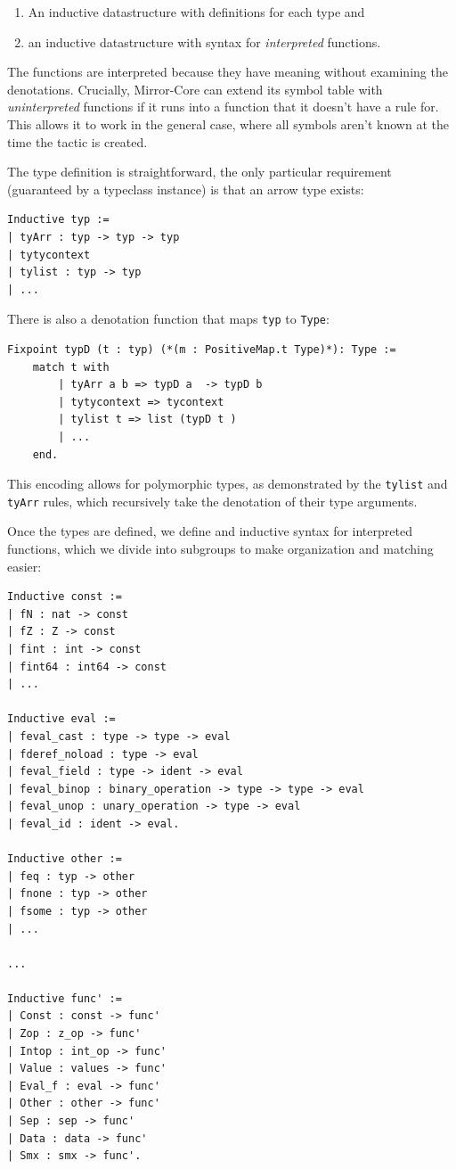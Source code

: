\documentclass{puthesis}
\begin{document}
\begin{enumerate}
\item An inductive datastructure with definitions for each type and
\item an inductive datastructure with syntax for \emph{interpreted}
  functions.
\end{enumerate}

The functions are interpreted because they have meaning without
examining the denotations. Crucially, Mirror-Core can extend its
symbol table with \emph{uninterpreted} functions if it runs into a
function that it doesn't have a rule for. This allows it to work in
the general case, where all symbols aren't known at the time the
tactic is created. 

The type definition is straightforward, the only particular
requirement (guaranteed by a typeclass instance) is that an arrow type
exists:

\begin{lstlisting}
Inductive typ :=
| tyArr : typ -> typ -> typ
| tytycontext
| tylist : typ -> typ
| ...
\end{lstlisting}

There is also a denotation function that maps \lstinline|typ| to
\lstinline|Type|:

\begin{lstlisting} 
Fixpoint typD (t : typ) (*(m : PositiveMap.t Type)*): Type :=
    match t with
        | tyArr a b => typD a  -> typD b
        | tytycontext => tycontext
        | tylist t => list (typD t )
        | ...
    end.
\end{lstlisting}

This encoding allows for polymorphic types, as demonstrated by the
\lstinline|tylist| and \lstinline|tyArr| rules, which recursively take
the denotation of their type arguments.

Once the types are defined, we define and inductive syntax for
interpreted functions, which we divide into subgroups to make
organization and matching easier:

\begin{lstlisting}
Inductive const :=
| fN : nat -> const
| fZ : Z -> const
| fint : int -> const
| fint64 : int64 -> const
| ...

Inductive eval :=
| feval_cast : type -> type -> eval
| fderef_noload : type -> eval
| feval_field : type -> ident -> eval
| feval_binop : binary_operation -> type -> type -> eval
| feval_unop : unary_operation -> type -> eval
| feval_id : ident -> eval.

Inductive other :=
| feq : typ -> other
| fnone : typ -> other
| fsome : typ -> other
| ...

...

Inductive func' :=
| Const : const -> func'
| Zop : z_op -> func'
| Intop : int_op -> func'
| Value : values -> func'
| Eval_f : eval -> func'
| Other : other -> func'
| Sep : sep -> func'
| Data : data -> func'
| Smx : smx -> func'.

\end{lstlisting}
\end{document}

